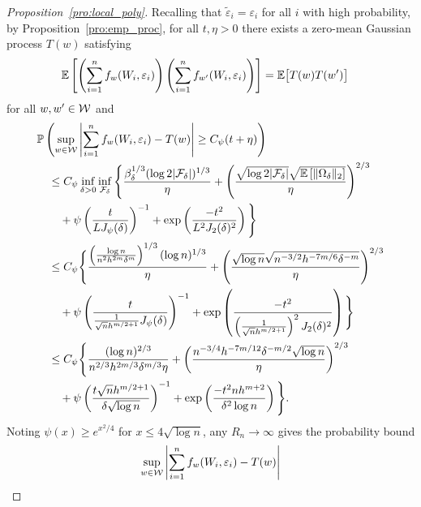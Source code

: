 \begin{proof}[Proposition~\ref{pro:local_poly}]
  Recalling that
  $\tilde\varepsilon_i = \varepsilon_i$
  for all $i$ with high probability,
  by Proposition~\ref{pro:emp_proc},
  for all $t, \eta > 0$ there exists a
  zero-mean Gaussian process $T(w)$ satisfying
  \begin{align*}
    \mathbb{E}\left[
      \left(\sum_{i=1}^n f_w(W_i, \varepsilon_i)\right)
      \left(\sum_{i=1}^n f_{w'}(W_i, \varepsilon_i)\right)
    \right]
    &= \mathbb{E}\big[ T(w) T(w')
    \big]
  \end{align*}
  for all $w, w' \in \mathcal{W}$ and
  \begin{align*}
    &\mathbb{P}\left(
      \sup_{w \in \mathcal{W}}
      \left| \sum_{i=1}^n f_{w}(W_i, \varepsilon_i)
      - T(w) \right|
      \geq C_\psi(t + \eta)
    \right) \\
    &\quad\leq
    C_\psi
    \inf_{\delta > 0}
    \inf_{\mathcal{F}_\delta}
    \Bigg\{
      \frac{\beta_\delta^{1/3} (\log 2 |\mathcal{F}_\delta|)^{1/3}}{\eta }
      + \left(\frac{\sqrt{\log 2 |\mathcal{F}_\delta|}
      \sqrt{\mathbb{E}\left[\|\Omega_\delta\|_2\right]}}{\eta }\right)^{2/3} \\
      &\qquad+
      \psi\left(\frac{t}{L J_\psi(\delta)}\right)^{-1}
      + \exp\left(\frac{-t^2}{L^2 J_2(\delta)^2}\right)
    \Bigg\} \\
    &\quad\leq
    C_\psi
    \Bigg\{
      \frac{
        \left(\frac{\log n} {n^2 h^{2m} \delta^{m}} \right)^{1/3}
      (\log n)^{1/3}}{\eta }
      + \left(\frac{\sqrt{\log n}
          \sqrt{n^{-3/2} h^{-7m/6} \delta^{-m}}
      }{\eta }\right)^{2/3} \\
      &\qquad+
      \psi\left(\frac{t}{\frac{1}{\sqrt{n} h^{m/2+1}}
      J_\psi(\delta)}\right)^{-1}
      + \exp\left(\frac{-t^2}{
          \left( \frac{1}{\sqrt{n} h^{m/2+1}} \right)^2
      J_2(\delta)^2}\right)
    \Bigg\} \\
    &\quad\leq
    C_\psi
    \Bigg\{
      \frac{
      (\log n)^{2/3}}{n^{2/3} h^{2m/3} \delta^{m/3} \eta}
      + \left(\frac{
        n^{-3/4} h^{-7m/12} \delta^{-m/2} \sqrt{\log n}}
      {\eta }\right)^{2/3} \\
      &\qquad+
      \psi\left(\frac{t\sqrt{n} h^{m/2+1}}
      {\delta \sqrt{\log n}}\right)^{-1}
      + \exp\left(\frac{-t^2n h^{m+2}}
      {\delta^2 \log n}\right)
    \Bigg\}.
  \end{align*}
  Noting $\psi(x) \geq e^{x^2/4}$ for $x \leq 4 \sqrt{\log n}$,
  any $R_n \to \infty$ gives the probability bound
  \begin{align*}
    \sup_{w \in \cW}
    \left| \sum_{i=1}^n f_{w}(W_i, \varepsilon_i)
    - T(w) \right|

\end{align*}
\end{proof}
